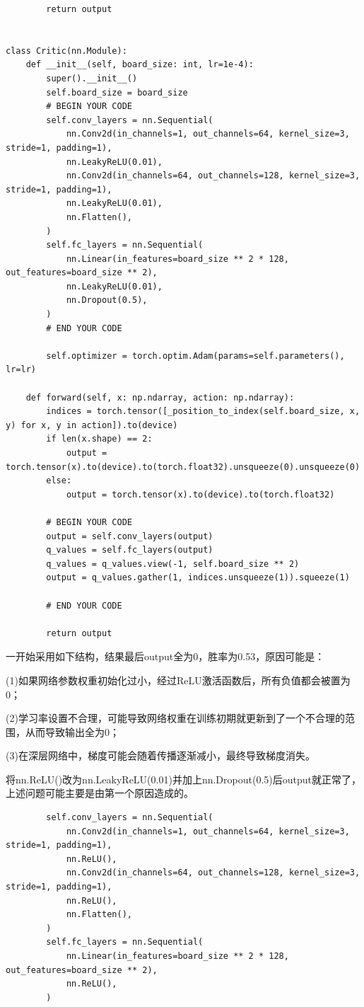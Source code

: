 \documentclass{ctexart}
\begin{document}
\begin{lstlisting}
        return output


class Critic(nn.Module):
    def __init__(self, board_size: int, lr=1e-4):
        super().__init__()
        self.board_size = board_size
        # BEGIN YOUR CODE
        self.conv_layers = nn.Sequential(
            nn.Conv2d(in_channels=1, out_channels=64, kernel_size=3, stride=1, padding=1),
            nn.LeakyReLU(0.01),
            nn.Conv2d(in_channels=64, out_channels=128, kernel_size=3, stride=1, padding=1),
            nn.LeakyReLU(0.01),
            nn.Flatten(),
        )
        self.fc_layers = nn.Sequential(
            nn.Linear(in_features=board_size ** 2 * 128, out_features=board_size ** 2),
            nn.LeakyReLU(0.01),
            nn.Dropout(0.5),
        )
        # END YOUR CODE

        self.optimizer = torch.optim.Adam(params=self.parameters(), lr=lr)

    def forward(self, x: np.ndarray, action: np.ndarray):
        indices = torch.tensor([_position_to_index(self.board_size, x, y) for x, y in action]).to(device)
        if len(x.shape) == 2:
            output = torch.tensor(x).to(device).to(torch.float32).unsqueeze(0).unsqueeze(0)
        else:
            output = torch.tensor(x).to(device).to(torch.float32)

        # BEGIN YOUR CODE
        output = self.conv_layers(output)
        q_values = self.fc_layers(output)
        q_values = q_values.view(-1, self.board_size ** 2)
        output = q_values.gather(1, indices.unsqueeze(1)).squeeze(1)

        # END YOUR CODE

        return output
	\end{lstlisting}

		一开始采用如下结构，结果最后output全为0，胜率为0.53，原因可能是：
		
		(1)如果网络参数权重初始化过小，经过ReLU激活函数后，所有负值都会被置为0；
	
		(2)学习率设置不合理，可能导致网络权重在训练初期就更新到了一个不合理的范围，从而导致输出全为0；
	
		(3)在深层网络中，梯度可能会随着传播逐渐减小，最终导致梯度消失。
		
		将nn.ReLU()改为nn.LeakyReLU(0.01)并加上nn.Dropout(0.5)后output就正常了，
	上述问题可能主要是由第一个原因造成的。
	\begin{lstlisting}
		self.conv_layers = nn.Sequential(
			nn.Conv2d(in_channels=1, out_channels=64, kernel_size=3, stride=1, padding=1),
			nn.ReLU(),
			nn.Conv2d(in_channels=64, out_channels=128, kernel_size=3, stride=1, padding=1),
			nn.ReLU(),
			nn.Flatten(),
		)
		self.fc_layers = nn.Sequential(
			nn.Linear(in_features=board_size ** 2 * 128, out_features=board_size ** 2),
			nn.ReLU(),
		)
		\end{lstlisting}
\end{document}
